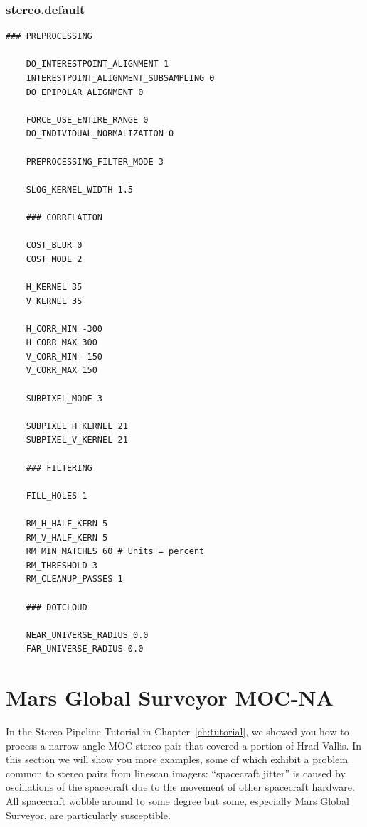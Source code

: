 \vfill

\subsubsection*{stereo.default}

\begin{center}\begin{minipage}{5.5in}
\begin{Verbatim}[frame=single,fontsize=\small,label=stereo.default for CTX North Terra Meridiani]
    ### PREPROCESSING

    DO_INTERESTPOINT_ALIGNMENT 1
    INTERESTPOINT_ALIGNMENT_SUBSAMPLING 0
    DO_EPIPOLAR_ALIGNMENT 0

    FORCE_USE_ENTIRE_RANGE 0
    DO_INDIVIDUAL_NORMALIZATION 0

    PREPROCESSING_FILTER_MODE 3

    SLOG_KERNEL_WIDTH 1.5

    ### CORRELATION

    COST_BLUR 0
    COST_MODE 2

    H_KERNEL 35
    V_KERNEL 35

    H_CORR_MIN -300
    H_CORR_MAX 300
    V_CORR_MIN -150
    V_CORR_MAX 150

    SUBPIXEL_MODE 3

    SUBPIXEL_H_KERNEL 21
    SUBPIXEL_V_KERNEL 21

    ### FILTERING

    FILL_HOLES 1

    RM_H_HALF_KERN 5
    RM_V_HALF_KERN 5
    RM_MIN_MATCHES 60 # Units = percent
    RM_THRESHOLD 3
    RM_CLEANUP_PASSES 1

    ### DOTCLOUD

    NEAR_UNIVERSE_RADIUS 0.0
    FAR_UNIVERSE_RADIUS 0.0
\end{Verbatim}
\end{minipage}\end{center}

\section{Mars Global Surveyor MOC-NA}

In the Stereo Pipeline Tutorial in Chapter~\ref{ch:tutorial}, we
showed you how to process a narrow angle \ac{MOC} stereo pair that
covered a portion of Hrad Vallis. In this section we will show you
more examples, some of which exhibit a problem common to stereo
pairs from linescan imagers: ``spacecraft jitter'' is caused by
oscillations of the spacecraft due to the movement of other spacecraft
hardware.  All spacecraft wobble around to some degree but some,
especially Mars Global Surveyor, are particularly susceptible.

